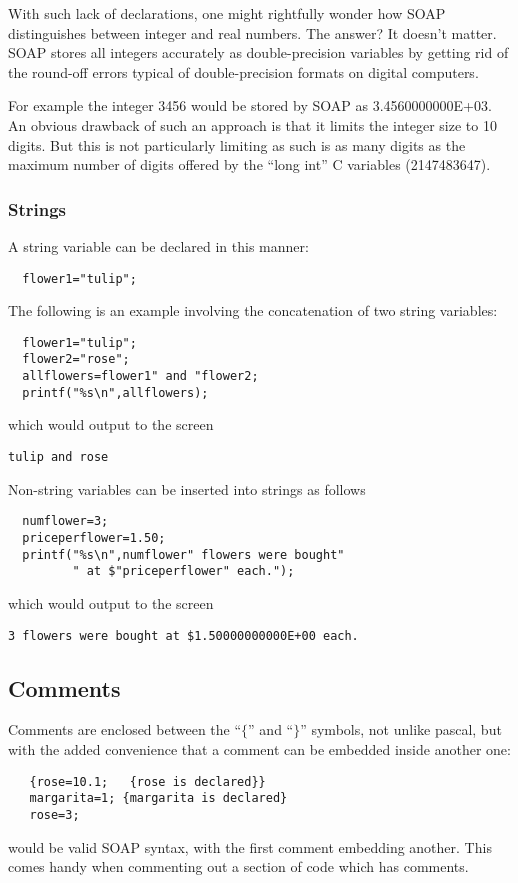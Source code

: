 \documentclass{warpdoc}
\begin{document}
With such lack of declarations, one might rightfully wonder
how SOAP distinguishes between integer and real numbers. The answer? It doesn't
matter. SOAP stores all integers  accurately as
double-precision variables by getting rid of
the round-off errors typical of double-precision formats on digital
computers.

For example the integer 3456 would be stored by SOAP as 3.4560000000E+03. An
obvious drawback of such an approach is that it limits the integer size
to 10 digits. But this is not particularly limiting as
such is as many digits as the maximum number of digits offered by the 
``long int''  C variables (2147483647).


\subsubsection{Strings}

A string variable can be declared in this manner:
%
\begin{verbatim}
  flower1="tulip";
\end{verbatim}
%
The following is an example involving the concatenation of two string variables:
%
\begin{verbatim}
  flower1="tulip";
  flower2="rose";
  allflowers=flower1" and "flower2;
  printf("%s\n",allflowers);
\end{verbatim}
%
which would output to the screen
%
\begin{verbatim}
tulip and rose
\end{verbatim}
%
Non-string variables can be inserted into strings as follows
%
\begin{verbatim}
  numflower=3;
  priceperflower=1.50;
  printf("%s\n",numflower" flowers were bought"
         " at $"priceperflower" each.");
\end{verbatim}
%
which would output to the screen
%
\begin{verbatim}
3 flowers were bought at $1.50000000000E+00 each.
\end{verbatim}
%

\subsection{Comments}

Comments are enclosed
between the ``$\{$'' and ``$\}$'' symbols, not unlike pascal, but with the added
convenience that a comment can be embedded inside another one:
%
\begin{verbatim}
   {rose=10.1;   {rose is declared}}
   margarita=1; {margarita is declared}
   rose=3;
\end{verbatim}
%
would be valid SOAP syntax, with the first comment embedding another. This comes handy 
when commenting out a section of code which has comments.
\end{document}
